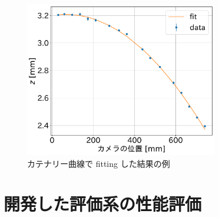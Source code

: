 \documentclass[../../main.tex]{subfiles}
\begin{document}
\begin{figure}[H]
    \centering
    \includegraphics[width=0.75\textwidth]{wiresag/wiresag_catenary.pdf}
    \caption{カテナリー曲線で fitting した結果の例}
    \label{fig:wiresag_catenary}
\end{figure}
\section{開発した評価系の性能評価}
\end{document}
